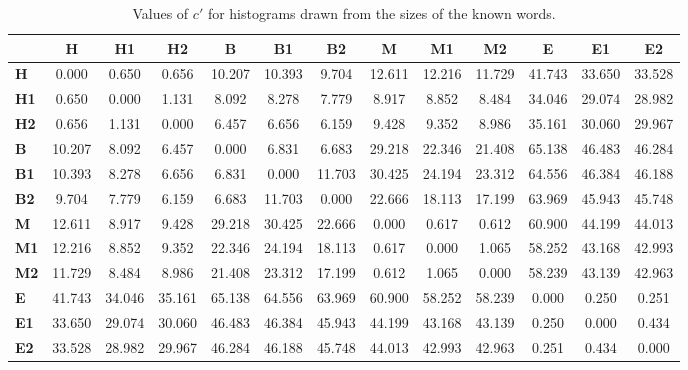 \begin{table*}[h!]
\begin{center}
\begin{tabular}{| l || c | c | c || c | c | c || c | c | c || c | c | c |}\hline
 & {\bf H} & {\bf H1} & {\bf H2} & {\bf B} & {\bf B1} & {\bf B2} & {\bf M} & {\bf M1} & {\bf M2} & {\bf E} & {\bf E1} & {\bf E2} \\\hline\hline
{\bf H} & 0.000 & 0.650 & 0.656 & 10.207 & 10.393 & 9.704 & 12.611 & 12.216 & 11.729 & 41.743 & 33.650 & 33.528 \\\hline
{\bf H1} & 0.650 & 0.000 & 1.131 & 8.092 & 8.278 & 7.779 & 8.917 & 8.852 & 8.484 & 34.046 & 29.074 & 28.982 \\\hline
{\bf H2} & 0.656 & 1.131 & 0.000 & 6.457 & 6.656 & 6.159 & 9.428 & 9.352 & 8.986 & 35.161 & 30.060 & 29.967 \\\hline\hline
{\bf B} & 10.207 & 8.092 & 6.457 & 0.000 & 6.831 & 6.683 & 29.218 & 22.346 & 21.408 & 65.138 & 46.483 & 46.284 \\\hline
{\bf B1} & 10.393 & 8.278 & 6.656 & 6.831 & 0.000 & 11.703 & 30.425 & 24.194 & 23.312 & 64.556 & 46.384 & 46.188 \\\hline
{\bf B2} & 9.704 & 7.779 & 6.159 & 6.683 & 11.703 & 0.000 & 22.666 & 18.113 & 17.199 & 63.969 & 45.943 & 45.748 \\\hline\hline
{\bf M} & 12.611 & 8.917 & 9.428 & 29.218 & 30.425 & 22.666 & 0.000 & 0.617 & 0.612 & 60.900 & 44.199 & 44.013 \\\hline
{\bf M1} & 12.216 & 8.852 & 9.352 & 22.346 & 24.194 & 18.113 & 0.617 & 0.000 & 1.065 & 58.252 & 43.168 & 42.993 \\\hline
{\bf M2} & 11.729 & 8.484 & 8.986 & 21.408 & 23.312 & 17.199 & 0.612 & 1.065 & 0.000 & 58.239 & 43.139 & 42.963 \\\hline\hline
{\bf E} & 41.743 & 34.046 & 35.161 & 65.138 & 64.556 & 63.969 & 60.900 & 58.252 & 58.239 & 0.000 & 0.250 & 0.251 \\\hline
{\bf E1} & 33.650 & 29.074 & 30.060 & 46.483 & 46.384 & 45.943 & 44.199 & 43.168 & 43.139 & 0.250 & 0.000 & 0.434 \\\hline
{\bf E2} & 33.528 & 28.982 & 29.967 & 46.284 & 46.188 & 45.748 & 44.013 & 42.993 & 42.963 & 0.251 & 0.434 & 0.000 \\\hline
\end{tabular}
\caption{Values of $c'$ for histograms drawn from the sizes of the known words.}
\end{center}
\end{table*}